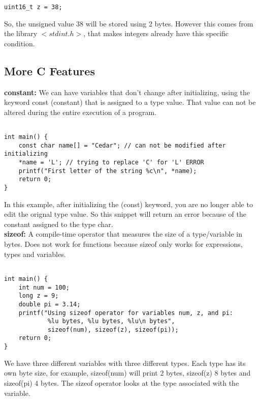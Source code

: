 \documentclass{article}
\begin{document}
\begin{verbatim}
uint16_t z = 38;
\end{verbatim}

So, the unsigned value 38 will be stored using 2 bytes. However this comes from the library $<stdint.h>$, that makes integers already have this specific
condition.

\subsection*{More C Features}
\textbf{constant:} We can have variables that don't change after initializing, using the keyword const (constant) that is assigned to a type value. 
That value can not be altered during the entire execution of a program. \\

\begin{verbatim}

int main() {
	const char name[] = "Cedar"; // can not be modified after initializing 
	*name = 'L'; // trying to replace 'C' for 'L' ERROR
	printf("First letter of the string %c\n", *name);
	return 0;
}

\end{verbatim}

In this example, after initializing the (const) keyword, you are no longer able to edit the orignal type value. So this snippet will return an error
because of the constant assigned to the type char. \\

\noindent \textbf{sizeof:} A compile-time operator that measures the size of a type/variable in bytes. Does not work for functions because sizeof only 
works for expressions, types and variables.

\begin{verbatim}

int main() {
	int num = 100;
	long z = 9;
	double pi = 3.14;
	printf("Using sizeof operator for variables num, z, and pi: 
			%lu bytes, %lu bytes, %lu\n bytes", 
			sizeof(num), sizeof(z), sizeof(pi));
	return 0;
}

\end{verbatim}

We have three different variables with three different types. Each type has its own byte size, for example, sizeof(num) will print 2 bytes, sizeof(z) 8 bytes
and sizeof(pi) 4 bytes. The sizeof operator looks at the type associated with the variable. 


\begin{verbatim}
\end{verbatim}
\end{document}
